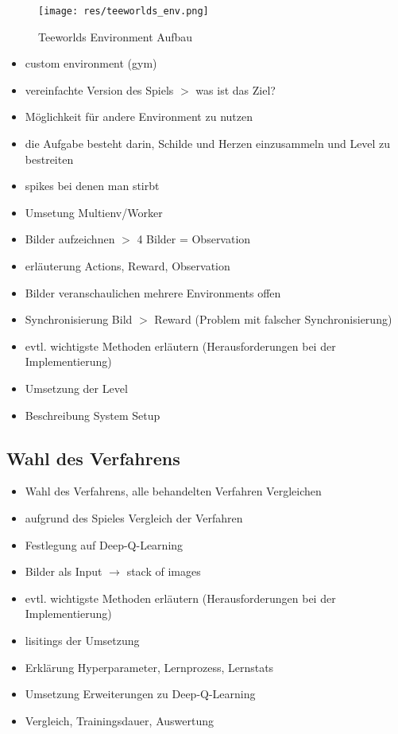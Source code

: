 \documentclass[11pt]{scrartcl}
\begin{document}
\begin{figure}[htp]
  \centering
  \texttt{[image: res/teeworlds\_env.png]}
  \caption{Teeworlds Environment Aufbau}
  \label{fig:teeworlds_env}
\end{figure}




\begin{itemize}
\itemsep0pt	
\item custom environment (gym)
\item vereinfachte Version des Spiels $>$ was ist das Ziel?
\item Möglichkeit für andere Environment zu nutzen
\item die Aufgabe besteht darin, Schilde und Herzen einzusammeln und Level zu bestreiten
\item spikes bei denen man stirbt
\item Umsetung Multienv/Worker
\item Bilder aufzeichnen $>$ 4 Bilder = Observation
\item erläuterung Actions, Reward, Observation
\item Bilder veranschaulichen mehrere Environments offen
\item Synchronisierung Bild $>$ Reward (Problem mit falscher Synchronisierung)
\item evtl. wichtigste Methoden erläutern (Herausforderungen bei der Implementierung)
\item Umsetzung der Level
\item Beschreibung System Setup
\end{itemize}

\subsection{Wahl des Verfahrens} %
\begin{itemize}
\itemsep0pt	
\item Wahl des Verfahrens, alle behandelten Verfahren Vergleichen
\item aufgrund des Spieles Vergleich der Verfahren
\item Festlegung auf Deep-Q-Learning
\item Bilder als Input $\rightarrow$ stack of images
\item evtl. wichtigste Methoden erläutern (Herausforderungen bei der Implementierung)
\item lisitings der Umsetzung
\item Erklärung Hyperparameter, Lernprozess, Lernstats
\item Umsetzung Erweiterungen zu Deep-Q-Learning
\item Vergleich, Trainingsdauer, Auswertung
\end{itemize}
\end{document}
